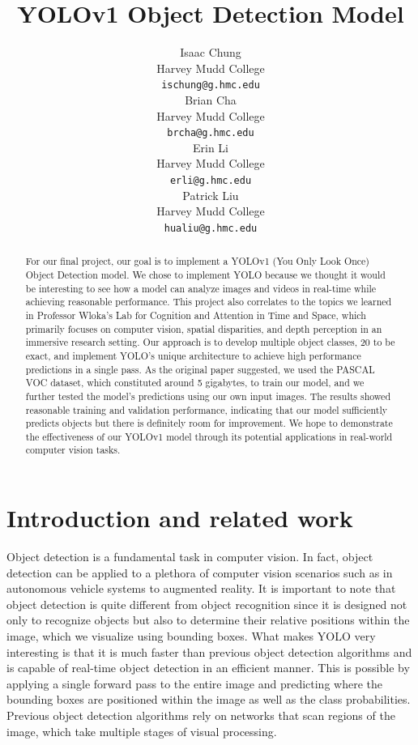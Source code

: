 \documentclass{article}
\title{YOLOv1 Object Detection Model}
\author{%
  Isaac Chung \\
  Harvey Mudd College \\
  \texttt{ischung@g.hmc.edu} \\
  \And
  Brian Cha \\
  Harvey Mudd College \\
  \texttt{brcha@g.hmc.edu} \\
  \And
  Erin Li \\
  Harvey Mudd College \\
  \texttt{erli@g.hmc.edu} \\
  \And
  Patrick Liu \\
  Harvey Mudd College \\
  \texttt{hualiu@g.hmc.edu} \\
}
\begin{document}
\maketitle


\begin{abstract}
  For our final project, our goal is to implement a YOLOv1 (You Only Look Once) Object Detection model. We chose to implement YOLO because we thought it would be interesting to see how a model can analyze images and videos in real-time while achieving reasonable performance. This project also correlates to the topics we learned in Professor Wloka's Lab for Cognition and Attention in Time and Space, which primarily focuses on computer vision, spatial disparities, and depth perception in an immersive research setting. Our approach is to develop multiple object classes, 20 to be exact, and implement YOLO's unique architecture to achieve high performance predictions in a single pass. As the original paper suggested, we used the PASCAL VOC dataset, which constituted around 5 gigabytes, to train our model, and we further tested the model's predictions using our own input images. The results showed reasonable training and validation performance, indicating that our model sufficiently predicts objects but there is definitely room for improvement. We hope to demonstrate the effectiveness of our YOLOv1 model through its potential applications in real-world computer vision tasks.
\end{abstract}


\section{Introduction and related work}

Object detection is a fundamental task in computer vision. In fact, object detection can be applied to a plethora of computer vision scenarios such as in autonomous vehicle systems to augmented reality. It is important to note that object detection is quite different from object recognition since it is designed not only to recognize objects but also to determine their relative positions within the image, which we visualize using bounding boxes. What makes YOLO very interesting is that it is much faster than previous object detection algorithms and is capable of real-time object detection in an efficient manner. This is possible by applying a single forward pass to the entire image and predicting where the bounding boxes are positioned within the image as well as the class probabilities. Previous object detection algorithms rely on networks that scan regions of the image, which take multiple stages of visual processing. \\
\end{document}
